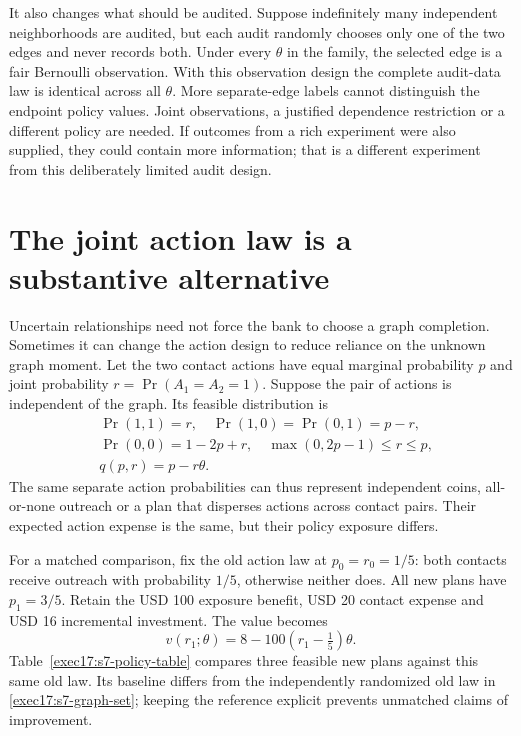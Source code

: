 It also changes what should be audited. Suppose indefinitely many independent
neighborhoods are audited, but each audit randomly chooses only one of the two
edges and never records both. Under every $\theta$ in the family, the selected
edge is a fair Bernoulli observation. With this observation design the complete
audit-data law is identical across all $\theta$. More separate-edge labels
cannot distinguish the endpoint policy values. Joint observations, a justified
dependence restriction or a different policy are needed. If outcomes from a
rich experiment were also supplied, they could contain more information; that
is a different experiment from this deliberately limited audit design.

\section{The joint action law is a substantive alternative}
\label{exec17:s7-coordination}

Uncertain relationships need not force the bank to choose a graph completion.
Sometimes it can change the action design to reduce reliance on the unknown
graph moment. Let the two contact actions have equal marginal probability $p$
and joint probability $r=\Pr(A_1=A_2=1)$. Suppose the pair of actions is independent
of the graph. Its feasible distribution is
\begin{equation}
 \begin{split}
  &\Pr(1,1)=r,\quad \Pr(1,0)=\Pr(0,1)=p-r,\\
  &\Pr(0,0)=1-2p+r,\quad
      \max(0,2p-1)\leq r\leq p,\\
  &q(p,r)=p-r\theta.
 \end{split}
 \label{exec17:s7-action-law}
\end{equation}
The same separate action probabilities can thus represent independent coins,
all-or-none outreach or a plan that disperses actions across contact pairs.
Their expected action expense is the same, but their policy exposure differs.

For a matched comparison, fix the old action law at $p_0=r_0=1/5$: both
contacts receive outreach with probability $1/5$, otherwise neither does. All
new plans have $p_1=3/5$. Retain the USD 100 exposure benefit, USD 20 contact
expense and USD 16 incremental investment. The value becomes
\begin{equation}
 v(r_1;\theta)=8-100(r_1-\tfrac15)\theta.
 \label{exec17:s7-coordinated-value}
\end{equation}
Table~\ref{exec17:s7-policy-table} compares three feasible new plans against
this same old law. Its baseline differs from the independently randomized old
law in \eqref{exec17:s7-graph-set}; keeping the reference explicit prevents
unmatched claims of improvement.

